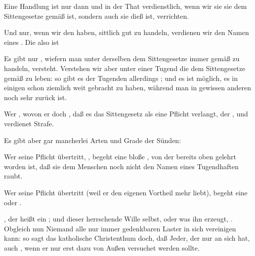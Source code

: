 \begin{aufza}
\item Eine Handlung ist nur dann  und in der That verdienstlich, wenn wir sie  sie dem Sittengesetze gemäß ist, sondern auch  sie dieß ist, verrichten.~
\item Und nur, wenn wir den  haben,  sittlich gut zu handeln, verdienen wir den Namen eines . Die  also ist 
\item Es gibt nur , wiefern man unter derselben  dem Sittengesetze immer gemäß zu handeln, versteht. Verstehen wir aber unter einer Tugend die  dem Sittengesetze  gemäß zu leben: so gibt es der Tugenden allerdings ; und es ist möglich, es in einigen schon ziemlich weit gebracht zu haben, während man in gewissen anderen noch sehr zurück ist.
\item Wer , wovon er doch , daß es das Sittengesetz als eine Pflicht verlangt, der , und verdienet Strafe.
\item Es gibt aber gar mancherlei Arten und Grade der Sünden:
\begin{aufzb}
\item Wer seine Pflicht übertritt, , begeht eine bloße , von der bereits oben gelehrt worden ist, daß sie dem Menschen noch nicht den Namen eines Tugendhaften raubt.
\item Wer seine Pflicht übertritt  (weil er den eigenen Vortheil mehr liebt), begeht eine  oder .
\item {}, der heißt ein ; und dieser herrschende Wille selbst, oder was ihn erzeugt,  . Obgleich nun Niemand alle nur immer gedenkbaren Laster in sich vereinigen kann: so sagt das katholische Christenthum doch, daß Jeder, der nur  an sich hat, auch , wenn er nur erst dazu von Außen versuchet werden sollte.

\end{aufzb}
\end{aufza}
